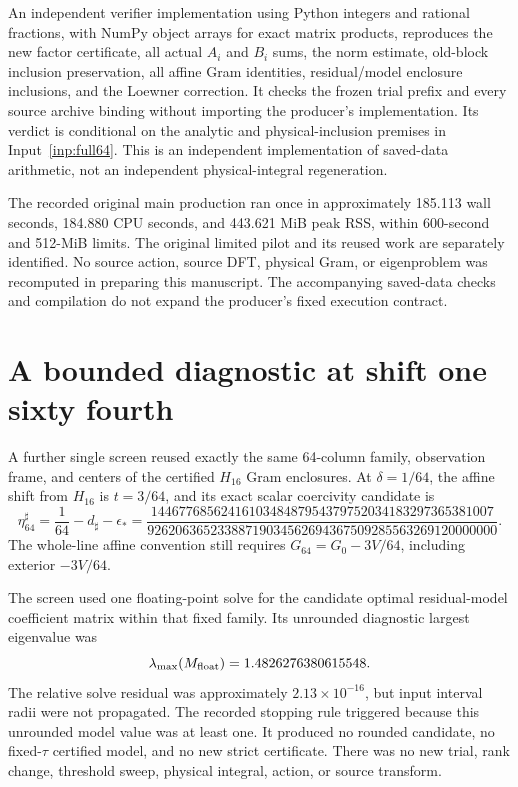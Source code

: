 \documentclass[11pt,a4paper]{article}
\numberwithin{equation}{section}
\theoremstyle{definition}\newtheorem{definition}[theorem]{Definition}
\theoremstyle{remark}\newtheorem{remark}[theorem]{Remark}
\begin{document}
An independent verifier implementation using Python integers and rational fractions, with NumPy object arrays for exact matrix products, reproduces the new factor certificate, all actual $A_i$ and $B_i$ sums, the norm estimate, old-block inclusion preservation, all affine Gram identities, residual/model enclosure inclusions, and the Loewner correction. It checks the frozen trial prefix and every source archive binding without importing the producer's implementation. Its verdict is conditional on the analytic and physical-inclusion premises in Input~\ref{inp:full64}. This is an independent implementation of saved-data arithmetic, not an independent physical-integral regeneration.

The recorded original main production ran once in approximately 185.113 wall seconds, 184.880 CPU seconds, and 443.621 MiB peak RSS, within 600-second and 512-MiB limits. The original limited pilot and its reused work are separately identified. No source action, source DFT, physical Gram, or eigenproblem was recomputed in preparing this manuscript. The accompanying saved-data checks and compilation do not expand the producer's fixed execution contract.

\section{A bounded diagnostic at shift one sixty fourth}\label{sec:diag64}
A further single screen reused exactly the same 64-column family, observation frame, and centers of the certified $H_{16}$ Gram enclosures. At $\delta=1/64$, the affine shift from $H_{16}$ is $t=3/64$, and its exact scalar coercivity candidate is
\begin{equation}\label{eq:eta64}
 \eta_{64}^{\sharp}=\frac1{64}-d_\sharp-\epsilon_*
 =\frac{1446776856241610348487954379752034183297365381007}
 {92620636523388719034562694367509285563269120000000}.
\end{equation}
The whole-line affine convention still requires $G_{64}=G_0-3V/64$, including exterior $-3V/64$.

The screen used one floating-point solve for the candidate optimal residual-model coefficient matrix within that fixed family. Its unrounded diagnostic largest eigenvalue was
\begin{equation}\label{eq:diag64value}
 \lambda_{\max}(M_{\rm float})=1.4826276380615548.
\end{equation}
The relative solve residual was approximately $2.13\times10^{-16}$, but input interval radii were not propagated. The recorded stopping rule triggered because this unrounded model value was at least one. It produced no rounded candidate, no fixed-$\tau$ certified model, and no new strict certificate. There was no new trial, rank change, threshold sweep, physical integral, action, or source transform.
\end{document}
